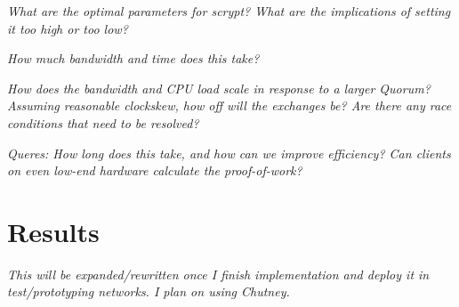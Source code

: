 \emph{What are the optimal parameters for scrypt? What are the implications of setting it too high or too low?}

\emph{How much bandwidth and time does this take?}

\emph{How does the bandwidth and CPU load scale in response to a larger Quorum? Assuming reasonable clockskew, how off will the exchanges be? Are there any race conditions that need to be resolved?}

\emph{Queres: How long does this take, and how can we improve efficiency? Can clients on even low-end hardware calculate the proof-of-work?}


\section{Results}


\emph{This will be expanded/rewritten once I finish implementation and deploy it in test/prototyping networks. I plan on using Chutney.}
